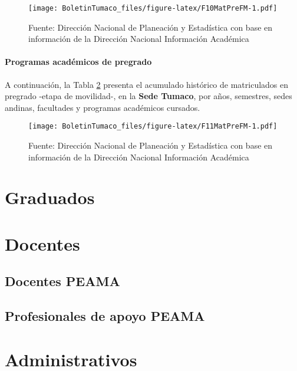 \documentclass[
]{book}
\begin{document}
\begin{figure}
\centering
\texttt{[image: BoletinTumaco\_files/figure-latex/F10MatPreFM-1.pdf]}
\caption{\label{fig:F10MatPreFM}Fuente: Dirección Nacional de Planeación y Estadística con base en información de la Dirección Nacional Información Académica}
\end{figure}

\hypertarget{programas-acaduxe9micos-de-pregrado-3}{%
\subsubsection{Programas académicos de pregrado}\label{programas-acaduxe9micos-de-pregrado-3}}

A continuación, la Tabla \ref{fig:F11MatPreFM} presenta el acumulado histórico de matriculados en pregrado -etapa de movilidad-, en la \textbf{Sede Tumaco}, por años, semestres, sedes andinas, facultades y programas académicos cursados.

\begin{figure}
\centering
\texttt{[image: BoletinTumaco\_files/figure-latex/F11MatPreFM-1.pdf]}
\caption{\label{fig:F11MatPreFM}Fuente: Dirección Nacional de Planeación y Estadística con base en información de la Dirección Nacional Información Académica}
\end{figure}

\hypertarget{Grad}{%
\chapter{Graduados}\label{Grad}}

\hypertarget{Doc}{%
\chapter{Docentes}\label{Doc}}

\hypertarget{DocPEAMA}{%
\section{Docentes PEAMA}\label{DocPEAMA}}

\hypertarget{DocApo}{%
\section{Profesionales de apoyo PEAMA}\label{DocApo}}

\hypertarget{Admi}{%
\chapter{Administrativos}\label{Admi}}
\end{document}
